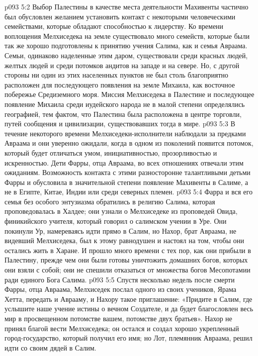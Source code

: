 \vs p093 5:2 Выбор Палестины в качестве места деятельности Махивенты частично был обусловлен желанием установить контакт с некоторыми человеческими семействами, которые обладают способностью к лидерству. Ко времени воплощения Мелхиседека на земле существовало много семейств, которые были так же хорошо подготовлены к принятию учения Салима, как и семья Авраама. Семьи, одинаково наделенные этим даром, существовали среди красных людей, желтых людей и среди потомков андитов на западе и на севере. Но, с другой стороны ни один из этих населенных пунктов не был столь благоприятно расположен для последующего появления на земле Михаила, как восточное побережье Средиземного моря. Миссия Мелхиседека в Палестине и последующее появление Михаила среди иудейского народа не в малой степени определялись географией, тем фактом, что Палестина была расположена в центре торговли, путей сообщения и цивилизации, существовавших тогда в мире.
\vs p093 5:3 В течение некоторого времени Мелхиседеки\hyp{}исполнители наблюдали за предками Авраама и они уверенно ожидали, когда в одном из поколений появится потомок, который будет отличаться умом, инициативностью, прозорливостью и искренностью. Дети Фарры, отца Авраама, во всех отношениях отвечали этим ожиданиям. Возможность контакта с этими разносторонне талантливыми детьми Фарры и обусловила в значительной степени появление Махивенты в Салиме, а не в Египте, Китае, Индии или среди северных племен.
\vs p093 5:4 Фарра и вся его семья без особого энтузиазма обратились в религию Салима, которая проповедовалась в Халдее; они узнали о Мелхиседеке из проповедей Овида, финикийского учителя, который говорил о салимском учении в Уре. Они покинули Ур, намереваясь идти прямо в Салим, но Нахор, брат Авраама, не видевший Мелхиседека, был к этому равнодушен и настоял на том, чтобы они остались жить в Харане. И прошло много времени с тех пор, как они прибыли в Палестину, прежде чем они были готовы уничтожить  домашних богов, которых они взяли с собой; они не спешили отказаться от множества богов Месопотамии ради единого Бога Салима.
\vs p093 5:5 Спустя несколько недель после смерти Фарры, отца Авраама, Мелхиседек послал одного из своих учеников, Ярама Хетта, передать и Аврааму, и Нахору такое приглашение: «Придите в Салим, где услышите наше учение истины о вечном Создателе, и да будет благословлен весь мир в просвещенном потомстве вашем, потомстве двух братьев». Нахор не принял благой вести Мелхиседека; он остался и создал хорошо укрепленный город\hyp{}государство, который получил его имя; но Лот, племянник Авраама, решил идти со своим дядей в Салим.
